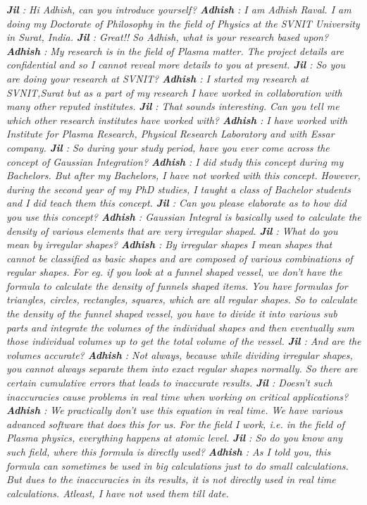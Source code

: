 \documentclass{article}
\begin{document}
\textit{\textbf{Jil} : Hi Adhish, can you introduce yourself? \hfill\break
\textbf{Adhish} : I am Adhish Raval. I am doing my Doctorate of Philosophy in the field of Physics at the SVNIT University in Surat, India.\hfill\break
\textbf{Jil} : Great!! So Adhish, what is your research based upon?\hfill\break
\textbf{Adhish} : My research is in the field of Plasma matter. The project details are confidential and so I cannot reveal more details to you at present. \hfill\break
\textbf{Jil} : So you are doing your research at SVNIT? \hfill\break
\textbf{Adhish} : I started my research at SVNIT,Surat but as a part of my research I have worked in collaboration with many other reputed institutes. \hfill\break
\textbf{Jil} : That sounds interesting. Can you tell me which other research institutes have worked with? \hfill\break
\textbf{Adhish} : I have worked with Institute for Plasma Research, Physical Research Laboratory and with Essar company. \hfill\break
\textbf{Jil} : So during your study period, have you ever come across the concept of Gaussian Integration?\hfill\break
\textbf{Adhish} : I did study this concept during my Bachelors. But after my Bachelors, I have not worked with this concept. However, during the second year of my PhD studies, I taught a class of Bachelor students and I did teach them this concept.\hfill\break
\textbf{Jil} : Can you please elaborate as to how did you use this concept? \hfill\break 
\textbf{Adhish} : Gaussian Integral is basically used to calculate the density of various elements that are very irregular shaped.\hfill\break
\textbf{Jil} : What do you mean by irregular shapes?\hfill\break
\textbf{Adhish} : By irregular shapes I mean shapes that cannot be classified as basic shapes and are composed of various combinations of regular shapes. For eg. if you look at a funnel shaped vessel, we don't have the formula to calculate the density of funnels shaped items. You have formulas for triangles, circles, rectangles, squares, which are all regular shapes. So to calculate the density of the funnel shaped vessel, you have to divide it into various sub parts and integrate the volumes of the individual shapes and then eventually sum those individual volumes up to get the total volume of the vessel.\hfill\break
\textbf{Jil} : And are the volumes accurate?\hfill\break
\textbf{Adhish} : Not always, because while dividing irregular shapes, you cannot always separate them into exact regular shapes normally. So there are certain cumulative errors that leads to inaccurate results.\hfill\break
\textbf{Jil} : Doesn't such inaccuracies cause problems in real time when working on critical applications?\hfill\break
\textbf{Adhish} : We practically don't use this equation in real time. We have various advanced software that does this for us. For the field I work, i.e. in the field of Plasma physics,
 everything happens at atomic level.\hfill\break
\textbf{Jil} : So do you know any such field, where this formula is directly used?\hfill\break
\textbf{Adhish} : As I told you, this formula can sometimes be used in big calculations just to do small calculations. But dues to the inaccuracies in its results, it is not directly used in real time calculations. Atleast, I have not used them till date.}\hfill\break\break
\end{document}
